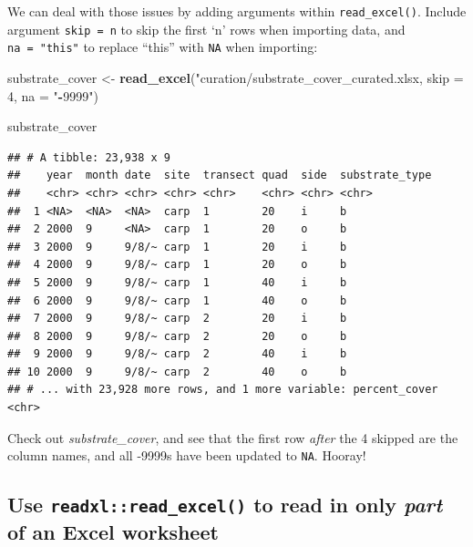 \documentclass[]{book}
\newenvironment{Shaded}{\begin{snugshade}}{\end{snugshade}}
\newcommand{\DecValTok}[1]{\textcolor[rgb]{0.00,0.00,0.81}{#1}}
\newcommand{\KeywordTok}[1]{\textcolor[rgb]{0.13,0.29,0.53}{\textbf{#1}}}
\newcommand{\NormalTok}[1]{#1}
\newcommand{\OperatorTok}[1]{\textcolor[rgb]{0.81,0.36,0.00}{\textbf{#1}}}
\newcommand{\StringTok}[1]{\textcolor[rgb]{0.31,0.60,0.02}{#1}}
\begin{document}
We can deal with those issues by adding arguments within \texttt{read\_excel()}. Include argument \texttt{skip\ =\ n} to skip the first `n' rows when importing data, and \texttt{na\ =\ "this"} to replace ``this'' with \texttt{NA} when importing:

\begin{Shaded}
\begin{Highlighting}[]
\NormalTok{substrate_cover <-}\StringTok{ }\KeywordTok{read_excel}\NormalTok{(}\StringTok{"curation/substrate_cover_curated.xlsx, skip = 4, na = "}\OperatorTok{-}\DecValTok{9999}\StringTok{")}
\end{Highlighting}
\end{Shaded}

\begin{Shaded}
\begin{Highlighting}[]
\NormalTok{substrate_cover}
\end{Highlighting}
\end{Shaded}

\begin{verbatim}
## # A tibble: 23,938 x 9
##    year  month date  site  transect quad  side  substrate_type
##    <chr> <chr> <chr> <chr> <chr>    <chr> <chr> <chr>         
##  1 <NA>  <NA>  <NA>  carp  1        20    i     b             
##  2 2000  9     <NA>  carp  1        20    o     b             
##  3 2000  9     9/8/~ carp  1        20    i     b             
##  4 2000  9     9/8/~ carp  1        20    o     b             
##  5 2000  9     9/8/~ carp  1        40    i     b             
##  6 2000  9     9/8/~ carp  1        40    o     b             
##  7 2000  9     9/8/~ carp  2        20    i     b             
##  8 2000  9     9/8/~ carp  2        20    o     b             
##  9 2000  9     9/8/~ carp  2        40    i     b             
## 10 2000  9     9/8/~ carp  2        40    o     b             
## # ... with 23,928 more rows, and 1 more variable: percent_cover <chr>
\end{verbatim}

Check out \emph{substrate\_cover}, and see that the first row \emph{after} the 4 skipped are the column names, and all -9999s have been updated to \texttt{NA}. Hooray!

\hypertarget{use-readxlread_excel-to-read-in-only-part-of-an-excel-worksheet}{%
\subsection{\texorpdfstring{Use \texttt{readxl::read\_excel()} to read in only \emph{part} of an Excel worksheet}{Use readxl::read\_excel() to read in only part of an Excel worksheet}}\label{use-readxlread_excel-to-read-in-only-part-of-an-excel-worksheet}}
\end{document}
